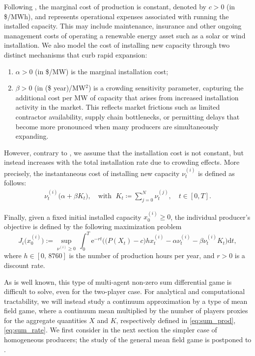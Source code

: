 \documentclass[12pt]{article}
\def\erm{\mathrm{e}}
\def\drm{\mathrm{d}}
\def\Nu{K}
\begin{document}
Following \cite{alasseur2023mean}, the marginal cost of production is constant, denoted by $c > 0$ (in \$/MWh), and represents operational expenses associated with running the installed capacity. This may include maintenance, insurance and other ongoing management costs of operating a renewable energy asset such as a solar or wind installation. We also model the cost of installing new capacity through two distinct mechanisms that curb rapid expansion:
\begin{enumerate}[$(i)$]\itemsep -2pt
    \item $\alpha > 0$ (in \$/MW) is the marginal installation cost;
    \item $\beta > 0$ (in (\$ year)/MW$^2$) is a crowding sensitivity parameter, capturing the additional cost per MW of capacity that arises from increased installation activity in the market. This reflects market frictions such as limited contractor availability, supply chain bottlenecks, or permitting delays that become more pronounced when many producers are simultaneously expanding.
\end{enumerate}
However, contrary to \cite{alasseur2023mean}, we assume that the installation cost is not constant, but instead increases with the total installation rate due to crowding effects. More precisely, the instantaneous cost of installing new capacity $\nu_t^{(i)}$ is defined as follows:
\begin{align}\label{eq:sum_rate}
  \nu_t^{(i)} \big( \alpha  + \beta \Nu_t \big), \quad \text{with } \; \Nu_t \coloneq \sum_{j =0}^N \nu_t^{(j)}, \quad t \in [0,T].
\end{align}

Finally, given a fixed initial installed capacity \( x^{(i)}_0 \geq 0 \), the individual producer's objective is defined by the following maximization problem
\begin{equation}\label{eq:cost_general}
J_i \big(x^{(i)}_0 \big) := \sup_{\nu^{(i)}\geq0}\,\int_0^{T}  \erm^{-rt} \Big(  \big( P(X_t) - c \big) h x_{t}^{(i)} - \alpha \nu_t^{(i)} - \beta 
\nu^{(i)}_t \Nu_t
\Big) \drm t,    
\end{equation}
where $h \in [0,\,8760]$ is the number of production hours per year, and $r>0$ is a discount rate.


As is well known, this type of multi-agent non-zero sum differential game is difficult to solve, even for the two-player case. For analytical and computational tractability, we will instead study a continuum  approximation by a type of mean field game, where a continuum mean multiplied by the number of players proxies for the aggregate quantities $X$ and $\Nu$, respectively defined in \eqref{eq:sum_prod}, \eqref{eq:sum_rate}. We first consider in the next section the simpler case of homogeneous producers; the study of the general mean field game is postponed to .
\end{document}

